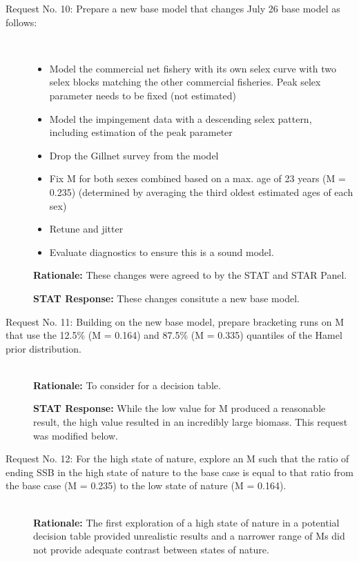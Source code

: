 \documentclass[12pt,]{article}
\begin{document}
\begin{description}
    
\item[Request No. 10: Prepare a new base model that changes July 26 base model as follows:] \hfill \\
       
\begin{itemize}
\item Model the commercial net fishery with its own selex curve with two selex blocks matching 
the other commercial fisheries.  Peak selex parameter needs to be fixed (not estimated)
\item Model the impingement data with a descending selex pattern, including estimation of 
the peak parameter
\item Drop the Gillnet survey from the model
\item Fix M for both sexes combined based on a max. age of 23 years (M = 0.235) (determined 
by averaging the third oldest estimated ages of each sex)
\item Retune and jitter
\item Evaluate diagnostics to ensure this is a sound model.
\end{itemize}

\textbf{Rationale:} These changes were agreed to by the STAT and STAR Panel.
  
\textbf{STAT Response:} These changes consitute a new base model. 
    
    
\item[Request No. 11: Building on the new base model, prepare bracketing runs on M 
that use the 12.5\% (M = 0.164) and 87.5\% (M = 0.335) quantiles of the Hamel prior 
distribution.] \hfill \\

\textbf{Rationale:} To consider for a decision table. 
  
\textbf{STAT Response:} While the low value for M produced a reasonable result, 
    the high value resulted in an incredibly large biomass. This request was modified below.
 
    
\item[Request No. 12: For the high state of nature, explore an M such that the ratio of ending 
SSB in the high state of nature to the base case is equal to that ratio from the base case 
(M = 0.235) to the low state of nature (M = 0.164).] \hfill \\


\textbf{Rationale:} The first exploration of a high state of nature in a potential decision 
table provided unrealistic results and a narrower range of Ms did not provide adequate contrast between states of nature.
  

\end{description}
\end{document}
